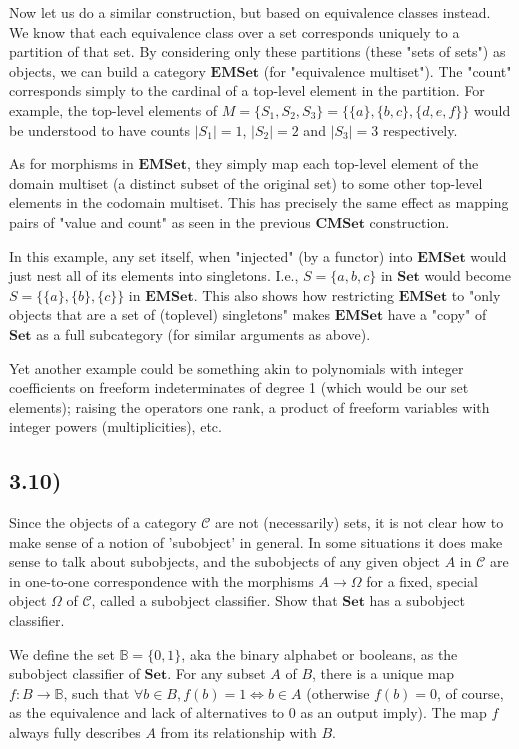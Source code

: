 \documentclass[12pt, letterpaper, twoside]{report}
\begin{document}
Now let us do a similar construction, but based on equivalence classes instead. We know that each equivalence class over a set corresponds uniquely to a partition of that set. By considering only these partitions (these "sets of sets") as objects, we can build a category $\mathbf{EMSet}$ (for "equivalence multiset"). The "count" corresponds simply to the cardinal of a top-level element in the partition. For example, the top-level elements of $M = \{ S_1, S_2, S_3 \}= \{ \{a\}, \{b, c\}, \{d, e, f\} \}$ would be understood to have counts $|S_1| = 1$, $|S_2| = 2$ and $|S_3| = 3$ respectively.

As for morphisms in $\mathbf{EMSet}$, they simply map each top-level element of the domain multiset (a distinct subset of the original set) to some other top-level elements in the codomain multiset. This has precisely the same effect as mapping pairs of "value and count" as seen in the previous $\mathbf{CMSet}$ construction.

In this example, any set itself, when "injected" (by a functor) into $\mathbf{EMSet}$ would just nest all of its elements into singletons. I.e., $S = \{ a, b, c \}$ in $\mathbf{Set}$ would become $S = \{ \{a\}, \{b\}, \{c\} \}$ in $\mathbf{EMSet}$. This also shows how restricting $\mathbf{EMSet}$ to "only objects that are a set of (toplevel) singletons" makes $\mathbf{EMSet}$ have a "copy" of $\mathbf{Set}$ as a full subcategory (for similar arguments as above).

Yet another example could be something akin to polynomials with integer coefficients on freeform indeterminates of degree 1 (which would be our set elements); raising the operators one rank, a product of freeform variables with integer powers (multiplicities), etc.


\subsection*{3.10)}

Since the objects of a category $\mathcal{C}$ are not (necessarily) sets, it is not clear how to make sense of a notion of 'subobject' in general. In some situations it does make sense to talk about subobjects, and the subobjects of any given object $A$ in $\mathcal{C}$ are in one-to-one correspondence with the morphisms $A \to \Omega$ for a fixed, special object $\Omega$ of $\mathcal{C}$, called a subobject classifier. Show that $\mathbf{Set}$ has a subobject classifier.

We define the set $\mathbb{B} = \{ 0, 1 \}$, aka the binary alphabet or booleans, as the subobject classifier of $\mathbf{Set}$. For any subset $A$ of $B$, there is a unique map $f: B \to \mathbb{B}$, such that $\forall b \in B, f(b) = 1 \Leftrightarrow b \in A$ (otherwise $f(b) = 0$, of course, as the equivalence and lack of alternatives to $0$ as an output imply). The map $f$ always fully describes $A$ from its relationship with $B$.
\end{document}
